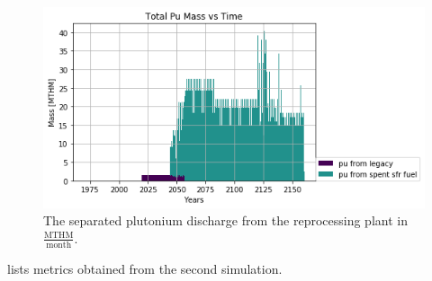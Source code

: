 \documentclass{article}
\begin{document}
\begin{figure}[htbp!]
    \begin{center}
        \includegraphics[scale=0.7]{./images/french-transition/pu.png}
    \end{center}
    \caption{The separated plutonium discharge from the reprocessing plant 
        in $\frac{\mbox{MTHM}}{\mbox{month}}$.}
    \label{fig:pu_no_cum}
\end{figure}

  lists metrics obtained from the second simulation.
\end{document}
